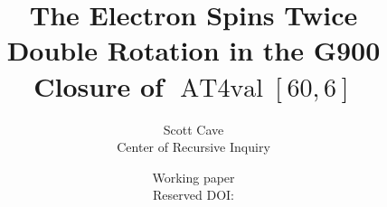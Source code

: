 \documentclass[11pt]{article}
\title{The Electron Spins Twice\\
\large Double Rotation in the G900 Closure of
\(\operatorname{AT4val}[60,6]\)}
\author{Scott Cave\\Center of Recursive Inquiry}
\date{Working paper\\Reserved DOI: \texttt{\PaperDOI}}
\begin{document}
\maketitle

\begin{abstract}

\end{abstract}
















\appendix



\end{document}
